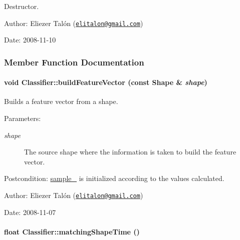 Destructor. 

\begin{Desc}
\item[Author:]Eliezer Talón (\href{mailto:elitalon@gmail.com}{\tt elitalon@gmail.com}) \end{Desc}
\begin{Desc}
\item[Date:]2008-11-10 \end{Desc}


\subsubsection{Member Function Documentation}
\hypertarget{class_classifier_6c5a7ef6298b0f0d84873297f1e8c7e9}{
\paragraph[{buildFeatureVector}]{\setlength{\rightskip}{0pt plus 5cm}void Classifier::buildFeatureVector (const {\bf Shape} \& {\em shape})}\hfill}
\label{class_classifier_6c5a7ef6298b0f0d84873297f1e8c7e9}


Builds a feature vector from a shape. 

\begin{Desc}
\item[Parameters:]
\begin{description}
\item[{\em shape}]The source shape where the information is taken to build the feature vector.\end{description}
\end{Desc}
\begin{Desc}
\item[Postcondition:]\hyperlink{class_classifier_3d46e3d6546304f24db6d9402375988a}{sample\_\-} is initialized according to the values calculated.\end{Desc}
\begin{Desc}
\item[Author:]Eliezer Talón (\href{mailto:elitalon@gmail.com}{\tt elitalon@gmail.com}) \end{Desc}
\begin{Desc}
\item[Date:]2008-11-07 \end{Desc}
\hypertarget{class_classifier_82e313296065218b1a01b5e44daa4c2f}{
\paragraph[{matchingShapeTime}]{\setlength{\rightskip}{0pt plus 5cm}float Classifier::matchingShapeTime ()}\hfill}
\label{class_classifier_82e313296065218b1a01b5e44daa4c2f}


